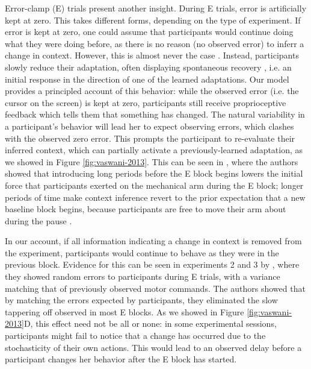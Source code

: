 \documentclass[a4paper,doc,floatsintext,natbib]{apa6}
\def \fref #1{Figure \ref{#1}}     %
\begin{document}
Error-clamp (E) trials present another insight. During E trials, error is artificially kept at zero. This takes different forms, depending on the type of experiment. If error is kept at zero, one could assume that participants would continue doing what they were doing before, as there is no reason (no observed error) to inferr a change in context. However, this is almost never the case \cite[e.g.][]{Smith_Interacting_2006,Ethier_Spontaneous_2008,Forano_Timescales_2020,Vaswani_Decay_2013,Scheidt_Persistence_2000}. Instead, participants slowly reduce their adaptation, often displaying spontaneous recovery \cite[e.g.][]{Smith_Interacting_2006}, i.e. an initial response in the direction of one of the learned adaptations. Our model provides a principled account of this behavior: while the observed error (i.e. the cursor on the screen) is kept at zero, participants still receive proprioceptive feedback which tells them that something has changed. The natural variability in a participant's behavior will lead her to expect observing errors, which clashes with the observed zero error. This prompts the participant to re-evaluate their inferred context, which can partially activate a previously-learned adaptation, as we showed in \fref{fig:vaswani-2013}. This can be seen in \cite{Criscimagna-Hemminger_Consolidation_2008}, where the authors showed that introducing long periods before the E block begins lowers the initial force that participants exerted on the mechanical arm during the E block; longer periods of time make context inference revert to the prior expectation that a new baseline block begins, because participants are free to move their arm about during the pause .

In our account, if all information indicating a change in context is removed from the experiment, participants would continue to behave as they were in the previous block. Evidence for this can be seen in experiments 2 and 3 by \cite{Vaswani_Decay_2013}, where they showed random errors to participants during E trials, with a variance matching that of previously observed motor commands. The authors showed that by matching the errors expected by participants, they eliminated the slow tappering off observed in most E blocks. As we showed in \fref{fig:vaswani-2013}D, this effect need not be all or none: in some experimental sessions, participants might fail to notice that a change has occurred due to the stochasticity of their own actions. This would lead to an observed delay before a participant changes her behavior after the E block has started.
\end{document}
